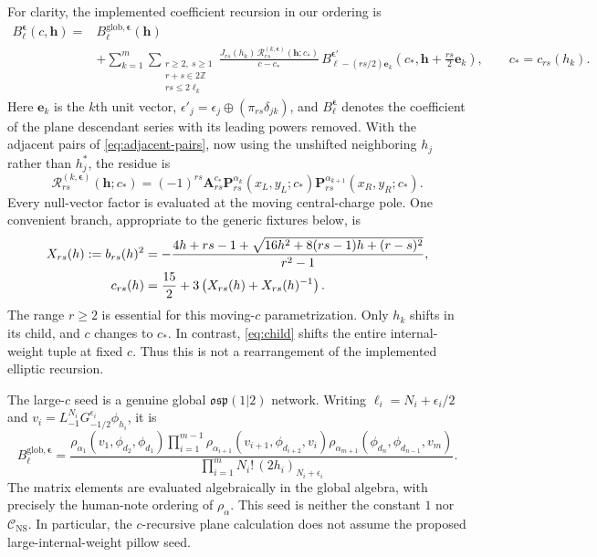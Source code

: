 \documentclass[11pt]{article}
\numberwithin{equation}{section}
\newcommand{\NS}{\mathrm{NS}}
\newcommand{\cC}{\mathcal C}
\newcommand{\ve}{\boldsymbol\epsilon}
\newcommand{\vh}{\boldsymbol h}
\begin{document}
For clarity, the implemented coefficient recursion in our ordering is
\begin{equation}
 \begin{aligned}
 B_{\boldsymbol\ell}^{\ve}(c,\vh)
 ={}&B_{\boldsymbol\ell}^{\mathrm{glob},\ve}(\vh)\\
 &+\sum_{k=1}^{m}
 \sum_{\substack{r\geq2,\ s\geq1\\r+s\in2\mathbb Z\\rs\leq2\ell_k}}
 \frac{J_{rs}(h_k)\,\mathcal R_{rs}^{(k,\ve)}(\vh;c_*)}
      {c-c_*}\,
 B_{\boldsymbol\ell-(rs/2)\boldsymbol e_k}^{\ve'}
       \left(c_*,\vh+\frac{rs}{2}\boldsymbol e_k\right),
 \qquad c_*=c_{rs}(h_k).
 \end{aligned}
 \label{eq:literature-c-recursion}
\end{equation}
Here $\boldsymbol e_k$ is the $k$th unit vector,
$\epsilon'_j=\epsilon_j\oplus(\pi_{rs}\delta_{jk})$, and
$B_{\boldsymbol\ell}^{\ve}$ denotes the coefficient of the plane
descendant series with its leading powers removed. With the adjacent
pairs of \eqref{eq:adjacent-pairs}, now using the unshifted neighboring
$h_j$ rather than $h_j^*$, the residue is
\begin{equation}
 \mathcal R_{rs}^{(k,\ve)}(\vh;c_*)
 =(-1)^{rs}\mathbf A^{c_*}_{rs}
  \mathbf P^{\alpha_k}_{rs}(x_L,y_L;c_*)
  \mathbf P^{\alpha_{k+1}}_{rs}(x_R,y_R;c_*).
 \label{eq:c-residue}
\end{equation}
Every null-vector factor is evaluated at the moving central-charge pole.
One convenient branch, appropriate to the generic fixtures below, is
\begin{align}
 X_{rs}(h):=b_{rs}(h)^2
 &=-\frac{4h+rs-1+\sqrt{16h^2+8(rs-1)h+(r-s)^2}}{r^2-1},\notag\\
 c_{rs}(h)&=\frac{15}{2}+3\left(X_{rs}(h)+X_{rs}(h)^{-1}\right).
 \label{eq:c-pole}
\end{align}
The range $r\geq2$ is essential for this moving-$c$ parametrization.
Only $h_k$ shifts in its child, and $c$ changes to $c_*$. In contrast,
\eqref{eq:child} shifts the entire internal-weight tuple at fixed $c$.
Thus this is not a rearrangement of the implemented elliptic recursion.

The large-$c$ seed is a genuine global $\mathfrak{osp}(1|2)$ network.
Writing $\ell_i=N_i+\epsilon_i/2$ and
$v_i=L_{-1}^{N_i}G_{-1/2}^{\epsilon_i}\phi_{h_i}$, it is
\begin{equation}
 B_{\boldsymbol\ell}^{\mathrm{glob},\ve}
 =\frac{\rho_{\alpha_1}(v_1,\phi_{d_2},\phi_{d_1})
     \displaystyle\prod_{i=1}^{m-1}
       \rho_{\alpha_{i+1}}(v_{i+1},\phi_{d_{i+2}},v_i)
     \rho_{\alpha_{m+1}}(\phi_{d_n},\phi_{d_{n-1}},v_m)}
    {\displaystyle\prod_{i=1}^{m}N_i!\,(2h_i)_{N_i+\epsilon_i}}.
 \label{eq:c-global-seed}
\end{equation}
The matrix elements are evaluated algebraically in the global algebra,
with precisely the human-note ordering of $\rho_\alpha$.
This seed is neither the constant $1$ nor $\cC_{\NS}$.
In particular, the $c$-recursive plane calculation does not assume the
proposed large-internal-weight pillow seed.
\end{document}
